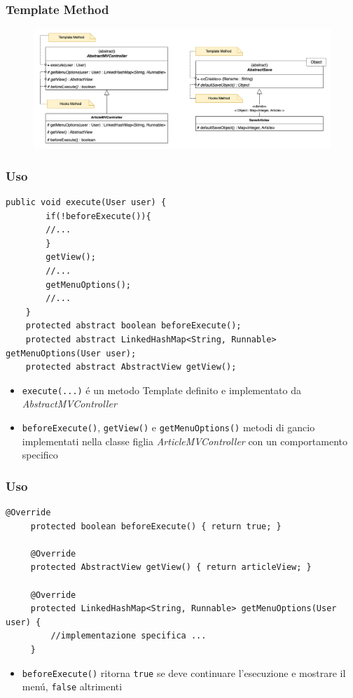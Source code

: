\begin{frame}
    \frametitle{Template Method}
    \begin{figure}
        \includegraphics[width=1\textwidth]{img/templateMethod.png}
    \end{figure}
\end{frame}

\begin{frame} [fragile]
    \frametitle{Uso}
    \begin{lstlisting}[autogobble, title={\texttt{AbstractMVController.java}}, morekeywords={beforeExecute, getView, getMenuOptions}]
    public void execute(User user) {
        if(!beforeExecute()){
        //...
        }
        getView();
        //...
        getMenuOptions();
        //...
    }
    protected abstract boolean beforeExecute();
    protected abstract LinkedHashMap<String, Runnable> getMenuOptions(User user);
    protected abstract AbstractView getView();
    \end{lstlisting}
    \begin{itemize}
        \item \texttt{execute(...)} é un metodo Template definito e implementato da \emph{AbstractMVController}
        \item \texttt{beforeExecute()}, \texttt{getView()} e \texttt{getMenuOptions()} metodi di gancio implementati nella classe figlia \emph{ArticleMVController} con un comportamento specifico
    \end{itemize}
\end{frame}

\begin{frame} [fragile]
 \frametitle{Uso}
   \begin{lstlisting}[autogobble, title={\texttt{ArticleMVController.java}}]
     @Override
     protected boolean beforeExecute() { return true; }

     @Override
     protected AbstractView getView() { return articleView; }

     @Override
     protected LinkedHashMap<String, Runnable> getMenuOptions(User user) {
         //implementazione specifica ...
     }
   \end{lstlisting}
    \begin{itemize}
        \item \texttt{beforeExecute()} ritorna \texttt{true} se deve continuare l'esecuzione e mostrare il menú, \texttt{false} altrimenti
    \end{itemize}
\end{frame}
